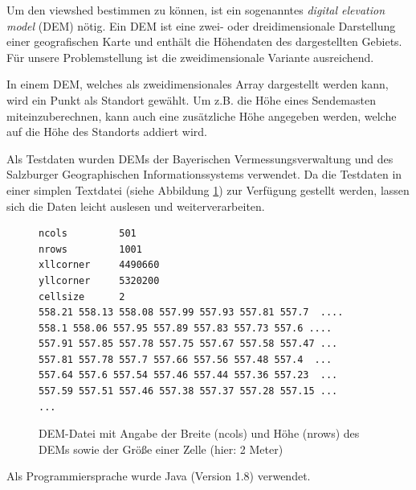 Um den viewshed bestimmen zu können, ist ein sogenanntes \textit{digital elevation model} (DEM) nötig. 
\noindent Ein DEM ist eine zwei- oder dreidimensionale Darstellung einer geografischen Karte und enthält die Höhendaten des dargestellten Gebiets. 
Für unsere Problemstellung ist die zweidimensionale Variante ausreichend.

\noindent In einem DEM, welches als zweidimensionales Array dargestellt werden kann, wird ein Punkt als Standort gewählt. Um z.B. die Höhe eines 
Sendemasten miteinzuberechnen, kann auch eine zusätzliche Höhe angegeben werden, welche auf die Höhe des Standorts addiert wird.

\noindent Als Testdaten wurden DEMs der Bayerischen Vermessungsverwaltung \cite{berchtesgaden} und des Salzburger Geographischen Informationssystems 
\cite{salzburg} verwendet. Da die Testdaten in einer simplen Textdatei (siehe Abbildung \ref{testfile}) zur Verfügung gestellt werden, lassen sich die Daten leicht 
auslesen und weiterverarbeiten.

\begin{figure}[!ht]
 \centering
 \begin{BVerbatim}
ncols         501
nrows         1001
xllcorner     4490660
yllcorner     5320200
cellsize      2
558.21 558.13 558.08 557.99 557.93 557.81 557.7  ....
558.1 558.06 557.95 557.89 557.83 557.73 557.6 ....
557.91 557.85 557.78 557.75 557.67 557.58 557.47 ...
557.81 557.78 557.7 557.66 557.56 557.48 557.4  ...
557.64 557.6 557.54 557.46 557.44 557.36 557.23  ...
557.59 557.51 557.46 557.38 557.37 557.28 557.15 ...
...
\end{BVerbatim}
\caption{DEM-Datei mit Angabe der Breite (ncols) und Höhe (nrows) des DEMs sowie der Größe einer Zelle (hier: 2 Meter)}
\label{testfile}
\end{figure}

\noindent Als Programmiersprache wurde Java (Version 1.8) verwendet. 

